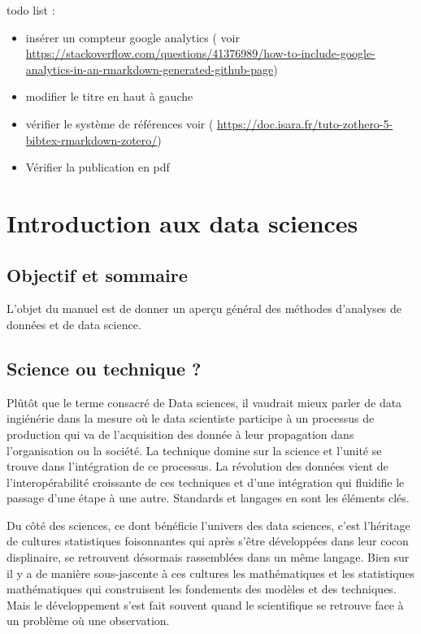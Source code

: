 \documentclass[
]{book}
\providecommand{\tightlist}{%
  \setlength{\itemsep}{0pt}\setlength{\parskip}{0pt}}
\begin{document}
todo list :

\begin{itemize}
\tightlist
\item
  insérer un compteur google analytics ( voir \url{https://stackoverflow.com/questions/41376989/how-to-include-google-analytics-in-an-rmarkdown-generated-github-page})
\item
  modifier le titre en haut à gauche
\item
  vérifier le système de références voir ( \url{https://doc.isara.fr/tuto-zothero-5-bibtex-rmarkdown-zotero/})
\item
  Vérifier la publication en pdf
\end{itemize}

\hypertarget{intro}{%
\chapter{Introduction aux data sciences}\label{intro}}

\hypertarget{objectif-et-sommaire}{%
\section{Objectif et sommaire}\label{objectif-et-sommaire}}

L'objet du manuel est de donner un aperçu général des méthodes d'analyses de données et de data science.

\hypertarget{science-ou-technique}{%
\section{Science ou technique ?}\label{science-ou-technique}}

Plûtôt que le terme consacré de Data sciences, il vaudrait mieux parler de data ingiénérie dans la mesure où le data scientiste participe à un processus de production qui va de l'acquisition des donnée à leur propagation dans l'organisation ou la société. La technique domine sur la science et l'unité se trouve dans l'intégration de ce processus. La révolution des données vient de l'interopérabilité croissante de ces techniques et d'une intégration qui fluidifie le passage d'une étape à une autre. Standards et langages en sont les éléments clés.

Du côté des sciences, ce dont bénéficie l'univers des data sciences, c'est l'héritage de cultures statistiques foisonnantes qui après s'être développées dans leur cocon displinaire, se retrouvent désormais rassemblées dans un même langage. Bien sur il y a de manière sous-jascente à ces cultures les mathématiques et les statistiques mathématiques qui construisent les fondements des modèles et des techniques. Mais le développement s'est fait souvent quand le scientifique se retrouve face à un problème où une observation.
\end{document}
